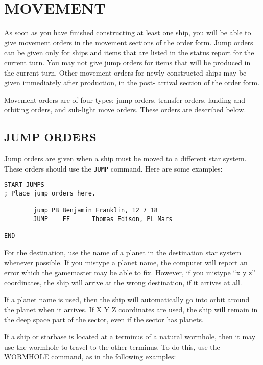 \documentclass[10pt,titlepage]{article}
\begin{document}
\section{MOVEMENT}
\label{sec:movement}

As soon as you have finished constructing at least one ship, you will be able
to give movement orders in the movement sections of the order form.  Jump
orders can be given only for ships and items that are listed in the status
report for the current turn.  You may not give jump orders for items that
will be produced in the current turn.  Other movement orders for newly
constructed ships may be given immediately after production, in the post-
arrival section of the order form.

Movement orders are of four types: jump orders, transfer orders, landing and
orbiting orders, and sub-light move orders.  These orders are described below.


\subsection{JUMP ORDERS}
\label{sec:jumporders}


Jump orders are given when a ship must be moved to a different star system.
These orders should use the \texttt{JUMP} command.  Here are some examples:

\begin{verbatim}
START JUMPS
; Place jump orders here.

        jump PB Benjamin Franklin, 12 7 18
        JUMP    FF      Thomas Edison, PL Mars

END
\end{verbatim} 

For the destination, use the name of a planet in the destination star system
whenever possible.  If you mistype a planet name, the computer will report an
error which the gamemaster may be able to fix.  However, if you mistype ``x y z''
coordinates, the ship will arrive at the wrong destination, if it arrives at
all.

If a planet name is used, then the ship will automatically go into orbit around
the planet when it arrives.  If X Y Z coordinates are used, the ship will
remain in the deep space part of the sector, even if the sector has planets.

If a ship or starbase is located at a terminus of a natural wormhole, then it
may use the wormhole to travel to the other terminus.  To do this, use the
WORMHOLE command, as in the following examples:
\end{document}
